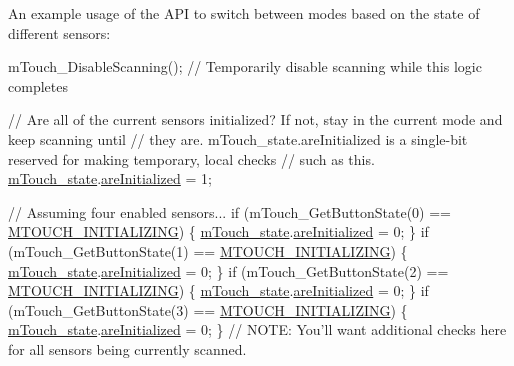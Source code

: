 An example usage of the A\+P\+I to switch between modes based on the state of different sensors\+: 
\begin{DoxyCode}
mTouch\_DisableScanning();   \textcolor{comment}{// Temporarily disable scanning while this logic completes}

\textcolor{comment}{// Are all of the current sensors initialized? If not, stay in the current mode and keep scanning until }
\textcolor{comment}{// they are. mTouch\_state.areInitialized is a single-bit reserved for making temporary, local checks }
\textcolor{comment}{// such as this.}
\hyperlink{m_touch_8c_ab678fb469a6bdd3d0b75cc4b48adf504}{mTouch\_state}.\hyperlink{structm_touch___state_ab1320a2e9a938dad2a563147945e97f9}{areInitialized} = 1;

\textcolor{comment}{// Assuming four enabled sensors...}
\textcolor{keywordflow}{if} (mTouch\_GetButtonState(0) == \hyperlink{m_touch_cap_2_p_i_c12_f_01_p_i_c16_f_01_library_2m_touch_8h_a7d72b112c35bc51408030eb7ecdcacd2a8ac4e988fd74c22ff6e99ee854cc848f}{MTOUCH\_INITIALIZING}) \{   
      \hyperlink{m_touch_8c_ab678fb469a6bdd3d0b75cc4b48adf504}{mTouch\_state}.\hyperlink{structm_touch___state_ab1320a2e9a938dad2a563147945e97f9}{areInitialized} = 0;    \}
\textcolor{keywordflow}{if} (mTouch\_GetButtonState(1) == \hyperlink{m_touch_cap_2_p_i_c12_f_01_p_i_c16_f_01_library_2m_touch_8h_a7d72b112c35bc51408030eb7ecdcacd2a8ac4e988fd74c22ff6e99ee854cc848f}{MTOUCH\_INITIALIZING}) \{   
      \hyperlink{m_touch_8c_ab678fb469a6bdd3d0b75cc4b48adf504}{mTouch\_state}.\hyperlink{structm_touch___state_ab1320a2e9a938dad2a563147945e97f9}{areInitialized} = 0;    \}
\textcolor{keywordflow}{if} (mTouch\_GetButtonState(2) == \hyperlink{m_touch_cap_2_p_i_c12_f_01_p_i_c16_f_01_library_2m_touch_8h_a7d72b112c35bc51408030eb7ecdcacd2a8ac4e988fd74c22ff6e99ee854cc848f}{MTOUCH\_INITIALIZING}) \{   
      \hyperlink{m_touch_8c_ab678fb469a6bdd3d0b75cc4b48adf504}{mTouch\_state}.\hyperlink{structm_touch___state_ab1320a2e9a938dad2a563147945e97f9}{areInitialized} = 0;    \}
\textcolor{keywordflow}{if} (mTouch\_GetButtonState(3) == \hyperlink{m_touch_cap_2_p_i_c12_f_01_p_i_c16_f_01_library_2m_touch_8h_a7d72b112c35bc51408030eb7ecdcacd2a8ac4e988fd74c22ff6e99ee854cc848f}{MTOUCH\_INITIALIZING}) \{   
      \hyperlink{m_touch_8c_ab678fb469a6bdd3d0b75cc4b48adf504}{mTouch\_state}.\hyperlink{structm_touch___state_ab1320a2e9a938dad2a563147945e97f9}{areInitialized} = 0;    \}
\textcolor{comment}{// NOTE: You'll want additional checks here for all sensors being currently scanned.}


\end{DoxyCode}
